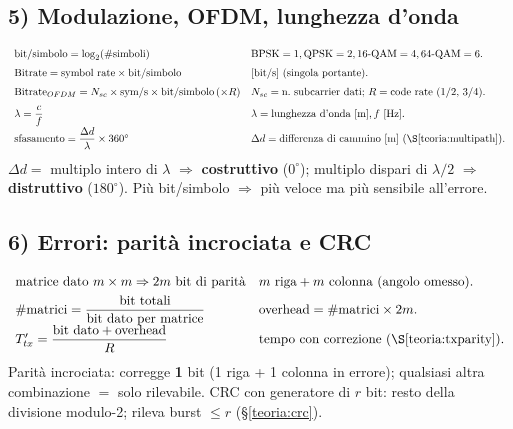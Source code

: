 \documentclass[11pt,a4paper]{report}
\begin{document}
\subsection*{5) Modulazione, OFDM, lunghezza d'onda}
\[
\begin{array}{ll}
\text{bit/simbolo}=\log_2(\#\text{simboli}) & \text{BPSK}=1, \text{QPSK}=2, \text{16-QAM}=4, \text{64-QAM}=6.\\[6pt]
\text{Bitrate}=\text{symbol rate}\times \text{bit/simbolo} & \text{[bit/s] (singola portante).}\\[6pt]
\text{Bitrate}_{OFDM}=N_{sc}\times \text{sym/s}\times \text{bit/simbolo}\,(\times R) & N_{sc}=\text{n.\ subcarrier dati; } R=\text{code rate ($1/2$, $3/4$).}\\[6pt]
\lambda=\dfrac{c}{f} & \lambda=\text{lunghezza d'onda [m]}, f \text{ [Hz]}.\\[6pt]
\text{sfasamento}=\dfrac{\Delta d}{\lambda}\times360^\circ & \Delta d=\text{differenza di cammino [m] (}\S\ref{teoria:multipath}\text{).}\\[4pt]
\end{array}
\]
$\Delta d=$ multiplo intero di $\lambda$ $\Rightarrow$ \textbf{costruttivo}
($0^\circ$); multiplo dispari di $\lambda/2$ $\Rightarrow$ \textbf{distruttivo}
($180^\circ$). Più bit/simbolo $\Rightarrow$ più veloce ma più sensibile
all'errore.

\subsection*{6) Errori: parità incrociata e CRC}
\[
\begin{array}{ll}
\text{matrice dato } m\times m \Rightarrow 2m \text{ bit di parità} & m \text{ riga} + m \text{ colonna (angolo omesso).}\\[4pt]
\#\text{matrici}=\dfrac{\text{bit totali}}{\text{bit dato per matrice}} & \text{overhead}=\#\text{matrici}\times 2m.\\[4pt]
T'_{tx}=\dfrac{\text{bit dato}+\text{overhead}}{R} & \text{tempo con correzione (}\S\ref{teoria:txparity}\text{).}\\[4pt]
\end{array}
\]
Parità incrociata: corregge \textbf{1} bit (1 riga + 1 colonna in errore);
qualsiasi altra combinazione $=$ solo rilevabile. CRC con generatore di $r$ bit:
resto della divisione modulo-2; rileva burst $\le r$ (\S\ref{teoria:crc}).
\end{document}
